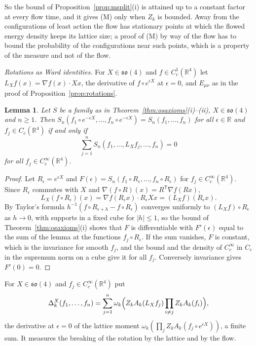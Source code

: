 \documentclass[aps,prd,twocolumn,superscriptaddress,nofootinbib,longbibliography,floatfix,amsmath,amssymb,10pt]{revtex4-2}
\newtheorem{lemma}[theorem]{Lemma}
\theoremstyle{definition}
\theoremstyle{remark}
\newcommand{\R}{\mathbb{R}}
\begin{document}
So the bound of Proposition~\ref{prop:msplit}(i) is attained up to a
constant factor at every flow time, and it gives (M) only when $Z_k$ is
bounded. Away from the configurations of least action the flow has
stationary points at which the flowed energy density keeps its lattice
size; a proof of (M) by way of the flow has to bound the probability of
the configurations near such points, which is a property of the measure
and not of the flow.

\emph{Rotations as Ward identities.} For $X\in\mathfrak{so}(4)$ and $f\in
C^1_c(\R^4)$ let $L_Xf(x)=\nabla f(x)\cdot Xx$, the derivative of
$f\circ e^{\epsilon X}$ at $\epsilon=0$, and $E_{\mu\nu}$ as in the proof
of Proposition~\ref{prop:rotations}.

\begin{lemma}\label{lem:ward}
Let $S$ be a family as in Theorem~\textup{\ref{thm:osaxioms}(i)--(ii)},
$X\in\mathfrak{so}(4)$ and $n\ge1$. Then $S_n(f_1\circ e^{-\epsilon X},
\dots,f_n\circ e^{-\epsilon X})=S_n(f_1,\dots,f_n)$ for all $\epsilon\in\R$
and $f_j\in C_c(\R^4)$ if and only if
\[
\sum_{j=1}^nS_n(f_1,\dots,L_Xf_j,\dots,f_n)=0
\]
for all $f_j\in C^\infty_c(\R^4)$.
\end{lemma}

\begin{proof}
Let $R_\epsilon=e^{\epsilon X}$ and $F(\epsilon)=S_n(f_1\circ R_\epsilon,
\dots,f_n\circ R_\epsilon)$ for $f_j\in C^\infty_c(\R^4)$. Since $R_\epsilon$
commutes with $X$ and $\nabla(f\circ R)(x)=R^{\mathsf T}\nabla f(Rx)$,
\[
L_X(f\circ R_\epsilon)(x)=\nabla f(R_\epsilon x)\cdot R_\epsilon Xx
=(L_Xf)(R_\epsilon x).
\]
By Taylor's formula $h^{-1}(f\circ R_{\epsilon+h}-f\circ R_\epsilon)$
converges uniformly to $(L_Xf)\circ R_\epsilon$ as $h\to0$, with supports
in a fixed cube for $|h|\le1$, so the bound of
Theorem~\ref{thm:osaxioms}(i) shows that $F$ is differentiable with
$F'(\epsilon)$ equal to the sum of the lemma at the functions $f_j\circ
R_\epsilon$. If the sum vanishes, $F$ is constant, which is the invariance
for smooth $f_j$, and the bound and the density of $C^\infty_c$ in $C_c$ in
the supremum norm on a cube give it for all $f_j$. Conversely invariance
gives $F'(0)=0$.
\end{proof}

For $X\in\mathfrak{so}(4)$ and $f_j\in C^\infty_c(\R^4)$ put
\[
\Delta^X_k(f_1,\dots,f_n)=\sum_{j=1}^n\omega_k\Bigl(Z_kA_k(L_Xf_j)
\prod_{i\ne j}Z_kA_k(f_i)\Bigr),
\]
the derivative at $\epsilon=0$ of the lattice moment
$\omega_k(\prod_jZ_kA_k(f_j\circ e^{\epsilon X}))$, a finite sum. It
measures the breaking of the rotation by the lattice and by the flow.
\end{document}
